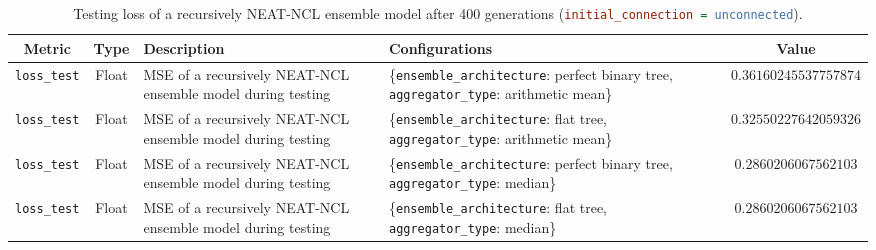 \documentclass{article}
\begin{document}
\begin{table}[H]
    \centering
    \begin{tabular}{|c|c|p{4cm}|p{5cm}|c|}
        \hline
        Metric & Type & Description & Configurations & Value \\
        \hline
        \small\texttt{loss\_test} & Float & MSE of a recursively NEAT-NCL ensemble model during testing & \{\texttt{ensemble\_architecture}: perfect binary tree, \texttt{aggregator\_type}: arithmetic mean\} & $0.36160245537757874$ \\
        \hline
        \small\texttt{loss\_test} & Float & MSE of a recursively NEAT-NCL ensemble model during testing & \{\texttt{ensemble\_architecture}: flat tree, \texttt{aggregator\_type}: arithmetic mean\} & $0.32550227642059326$ \\
        \hline
        \small\texttt{loss\_test} & Float & MSE of a recursively NEAT-NCL ensemble model during testing & \{\texttt{ensemble\_architecture}: perfect binary tree, \texttt{aggregator\_type}: median\} & $0.2860206067562103$ \\
        \hline
        \small\texttt{loss\_test} & Float & MSE of a recursively NEAT-NCL ensemble model during testing & \{\texttt{ensemble\_architecture}: flat tree, \texttt{aggregator\_type}: median\} & $0.2860206067562103$ \\
        \hline
    \end{tabular}
    \caption{Testing loss of a recursively NEAT-NCL ensemble model after 400 generations (\lstinline[language=ini]|initial_connection = unconnected|). }
    \label{table:experiment_6_neat_ncl_unconnected}
\end{table}
\end{document}
